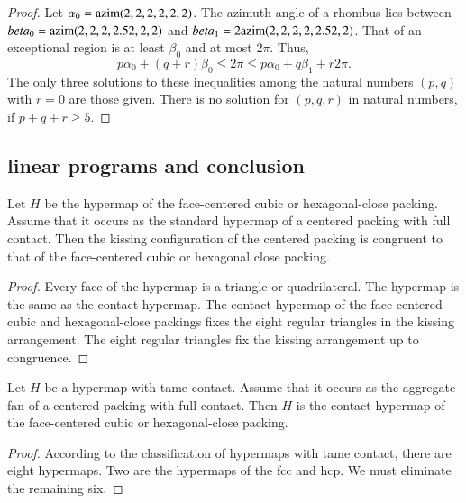 \begin{proof} Let $\alpha_0 = {\operatorname{azim}}(2,2,2,2,2,2)$.  The azimuth angle of a rhombus lies between $beta_0 = {\operatorname{azim}}(2,2,2,2.52,2,2)$ and
$beta_1 = 2{\operatorname{azim}}(2,2,2,2,2.52,2)$.  That of an exceptional region is at least $\beta_0$ and at most $2\pi$.  Thus,
$$
p\alpha_0 + (q+r) \beta_0 \le 2\pi \le p\alpha_0 + q\beta_1 + r 2\pi.
$$
The only three solutions to these inequalities among the natural numbers $(p,q)$ with $r=0$ are those given. There is no solution for $(p,q,r)$ in natural numbers, if $p+q+r\ge 5$.
\end{proof}





\subsection{linear programs and conclusion}

\begin{lemma}\label{lemma:kiss-fcc} Let $H$ be the hypermap of the face-centered cubic or hexagonal-close packing.   Assume that it occurs as the standard hypermap of a centered packing with full contact.  Then the kissing configuration of the centered packing is congruent to that of the face-centered cubic or hexagonal close packing.
\end{lemma}

\begin{proof} Every face of the hypermap is a triangle or quadrilateral.  The  hypermap is the same as the contact hypermap.  The contact hypermap of the face-centered cubic and hexagonal-close packings fixes the eight regular triangles in the kissing arrangement.  The eight regular triangles fix the kissing arrangement up to congruence.
\end{proof}

\begin{lemma}\label{lemma:fcc} Let $H$ be a hypermap with tame contact.  Assume that it occurs as the aggregate fan of a centered packing with full contact.  Then $H$ is the contact hypermap of the face-centered cubic or hexagonal-close packing.
\end{lemma}

\begin{proof} According to the classification of hypermaps with tame contact, there are eight hypermaps.  Two are the hypermaps of the fcc and hcp.  We must eliminate the remaining six.
\end{proof}


